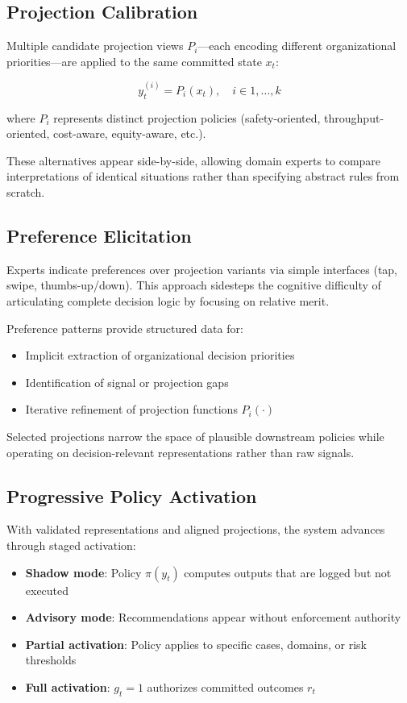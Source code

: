 \documentclass[11pt]{article}
\begin{document}
\subsection{Projection Calibration}

Multiple candidate projection views ${P_i}$---each encoding different organizational priorities---are applied to the same committed state $x_t$:

\begin{equation}
y_t^{(i)} = P_i(x_t), \quad i \in {1, \dots, k}
\end{equation}

where $P_i$ represents distinct projection policies (safety-oriented, throughput-oriented, cost-aware, equity-aware, etc.).

These alternatives appear side-by-side, allowing domain experts to compare interpretations of identical situations rather than specifying abstract rules from scratch.

\subsection{Preference Elicitation}

Experts indicate preferences over projection variants via simple interfaces (tap, swipe, thumbs-up/down). This approach sidesteps the cognitive difficulty of articulating complete decision logic by focusing on relative merit.

Preference patterns provide structured data for:
\begin{itemize}
\item Implicit extraction of organizational decision priorities
\item Identification of signal or projection gaps
\item Iterative refinement of projection functions $P_i(\cdot)$
\end{itemize}

Selected projections narrow the space of plausible downstream policies while operating on decision-relevant representations rather than raw signals.

\subsection{Progressive Policy Activation}

With validated representations and aligned projections, the system advances through staged activation:

\begin{itemize}
\item \textbf{Shadow mode}: Policy $\pi(y_t)$ computes outputs that are logged but not executed
\item \textbf{Advisory mode}: Recommendations appear without enforcement authority
\item \textbf{Partial activation}: Policy applies to specific cases, domains, or risk thresholds
\item \textbf{Full activation}: $g_t = 1$ authorizes committed outcomes $r_t$
\end{itemize}
\end{document}
